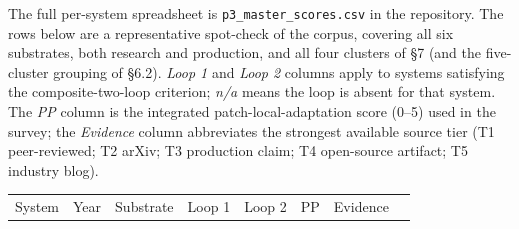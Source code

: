 \documentclass[
]{article}
\newcounter{none} %
\begin{document}
The full per-system spreadsheet is \texttt{p3\_master\_scores.csv} in
the repository. The rows below are a representative spot-check of the
corpus, covering all six substrates, both research and production, and
all four clusters of §7 (and the five-cluster grouping of §6.2).
\emph{Loop 1} and \emph{Loop 2} columns apply to systems satisfying the
composite-two-loop criterion; \emph{n/a} means the loop is absent for
that system. The \emph{PP} column is the integrated
patch-local-adaptation score (0--5) used in the survey; the
\emph{Evidence} column abbreviates the strongest available source tier
(T1 peer-reviewed; T2 arXiv; T3 production claim; T4 open-source
artifact; T5 industry blog).

\begingroup\small

{\def\LTcaptype{none} %
\begin{longtable}[]{@{}
  >{\raggedright\arraybackslash}p{}
  >{\raggedleft\arraybackslash}p{}
  >{\raggedright\arraybackslash}p{}
  >{\raggedright\arraybackslash}p{}
  >{\raggedright\arraybackslash}p{}
  >{\raggedleft\arraybackslash}p{}
  >{\raggedright\arraybackslash}p{}
  >{\raggedright\arraybackslash}p{}@{}}
\toprule\noalign{}
\begin{minipage}[b]{\linewidth}\raggedright
System
\end{minipage} & \begin{minipage}[b]{\linewidth}\raggedleft
Year
\end{minipage} & \begin{minipage}[b]{\linewidth}\raggedright
Substrate
\end{minipage} & \begin{minipage}[b]{\linewidth}\raggedright
Loop 1
\end{minipage} & \begin{minipage}[b]{\linewidth}\raggedright
Loop 2
\end{minipage} & \begin{minipage}[b]{\linewidth}\raggedleft
PP
\end{minipage} & \begin{minipage}[b]{\linewidth}\raggedright
Evidence
\end{minipage} & \begin{minipage}[b]{\linewidth}\raggedright

\end{minipage}
\end{longtable}}
\end{document}
